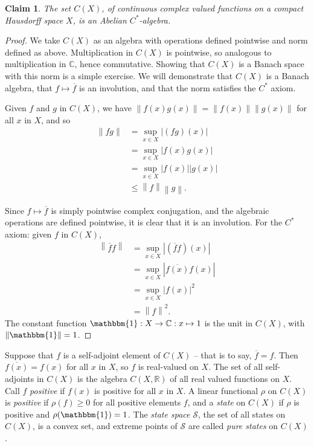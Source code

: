 \documentclass[11pt,a4paper]{report}
\theoremstyle{plain}
\newtheorem*{claim}{Claim}
\theoremstyle{definition}
\newcommand{\1}{\mathbbm{1}}
\newcommand{\C}{\mathbb{C}}
\newcommand{\R}{\mathbb{R}}
\newcommand{\CX}{C(X)}
\renewcommand{\S}{\mathscr{S}}
\renewcommand{\bar}{\overline}
\begin{document}
\begin{claim}
	The set $\CX$, of continuous complex valued functions on a compact Hausdorff 
	space $X$, is an Abelian $C^\ast$-algebra.
\end{claim}
\begin{proof}
	We take $\CX$ as an algebra with operations defined pointwise and norm defined 
	as above. Multiplication in $\CX$ is pointwise, so analogous to multiplication 
	in $\C$, hence commutative. Showing that $\CX$ is a Banach space with this norm 
	is a simple exercise. We will demonstrate that $\CX$ is a Banach algebra, that 
	$f\mapsto\overline{f}$ is an involution, and that the norm satisfies the 
	$C^\ast$ axiom.
	
	Given $f$ and $g$ in $\CX$, we have $\left\|f(x)g(x)\right\| = 
	\left\|f(x)\right\|\left\|g(x)\right\|$ for all $x$ in $X$, and so 
	\begin{align*}
				\left\|fg\right\| 
		&= 		\sup_{x\in X}|(fg)(x)|														\\
		&= 		\sup_{x\in X}|f(x)g(x)|														\\
		&=		\sup_{x\in X}|f(x)||g(x)|													\\
		&\leq	\left\|f\right\|\left\|g\right\|.
	\end{align*}
	
	Since $f\mapsto\overline{f}$ is simply pointwise complex conjugation, and the 
	algebraic operations are defined pointwise, it is clear that it is an 
	involution. For the $C^\ast$ axiom: given $f$ in $\CX$,
	\begin{align*}
				\left\|\bar f f\right\| 
		&= 		\sup_{x\in X}|(\bar f f)(x)|												\\
		&= 		\sup_{x\in X}|\bar{f(x)} f(x)|												\\
		&=		\sup_{x\in X}|f(x)|^2														\\
		&=		\left\|f\right\|^2.
	\end{align*}
	The constant function $\1:X\to\C:x\mapsto 1$ is the unit in $\CX$, 
	with $\left\|\1\right\| = 1$.
\end{proof}

Suppose that $f$ is a self-adjoint element of $\CX$ -- that is to say, $\bar f = 
f$. Then~$\bar{f(x)} = f(x)$ for all $x$ in $X$, so $f$ is real-valued on $X$. 
The set of all self-adjoints in $\CX$ is the algebra $C(X,\R)$ of all real 
valued functions on $X$. Call $f$ \emph{positive} if $f(x)$ is positive for all 
$x$ in $X$. 
A linear functional $\rho$ on $\CX$ is \emph{positive} if $\rho(f)\geq 0$ for 
all positive elements $f$, and a \emph{state} on $\CX$ if $\rho$ is positive and 
$\rho(\1)=1$. The \emph{state space} $\S$, the set of all states on $\CX$, is a 
convex set, and extreme points of $\S$ are called \emph{pure states} on $\CX$.
\end{document}
